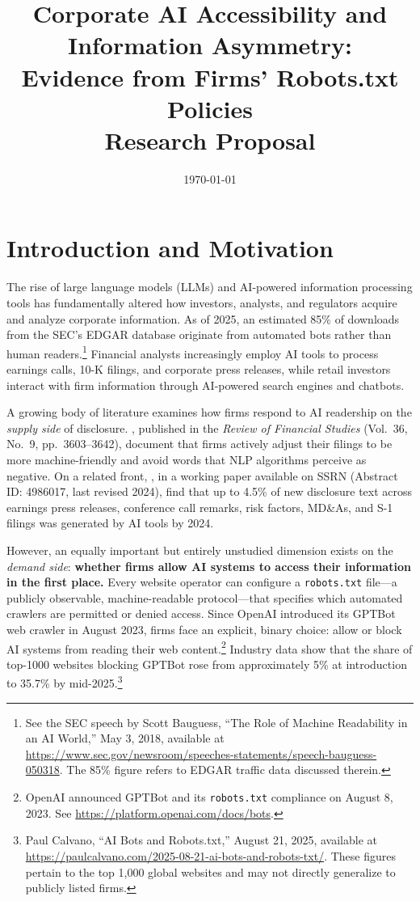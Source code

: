 \documentclass[12pt,a4paper]{article}
\title{\textbf{Corporate AI Accessibility and Information Asymmetry: \\
Evidence from Firms' Robots.txt Policies}\\
\vspace{0.5cm}
\large Research Proposal}
\author{}
\date{\today}
\begin{document}
\maketitle

\section{Introduction and Motivation}

The rise of large language models (LLMs) and AI-powered information processing tools has fundamentally altered how investors, analysts, and regulators acquire and analyze corporate information. As of 2025, an estimated 85\% of downloads from the SEC's EDGAR database originate from automated bots rather than human readers.\footnote{See the SEC speech by Scott Bauguess, ``The Role of Machine Readability in an AI World,'' May 3, 2018, available at \url{https://www.sec.gov/newsroom/speeches-statements/speech-bauguess-050318}. The 85\% figure refers to EDGAR traffic data discussed therein.} Financial analysts increasingly employ AI tools to process earnings calls, 10-K filings, and corporate press releases, while retail investors interact with firm information through AI-powered search engines and chatbots.

A growing body of literature examines how firms respond to AI readership on the \emph{supply side} of disclosure. \citet{CaoJiangYangZhang2023}, published in the \emph{Review of Financial Studies} (Vol.\ 36, No.\ 9, pp.\ 3603--3642), document that firms actively adjust their filings to be more machine-friendly and avoid words that NLP algorithms perceive as negative. On a related front, \citet{BlankespoorDeHaanLi2024}, in a working paper available on SSRN (Abstract ID: 4986017, last revised 2024), find that up to 4.5\% of new disclosure text across earnings press releases, conference call remarks, risk factors, MD\&As, and S-1 filings was generated by AI tools by 2024.

However, an equally important but entirely unstudied dimension exists on the \emph{demand side}: \textbf{whether firms allow AI systems to access their information in the first place.} Every website operator can configure a \texttt{robots.txt} file---a publicly observable, machine-readable protocol---that specifies which automated crawlers are permitted or denied access. Since OpenAI introduced its GPTBot web crawler in August 2023, firms face an explicit, binary choice: allow or block AI systems from reading their web content.\footnote{OpenAI announced GPTBot and its \texttt{robots.txt} compliance on August 8, 2023. See \url{https://platform.openai.com/docs/bots}.} Industry data show that the share of top-1000 websites blocking GPTBot rose from approximately 5\% at introduction to 35.7\% by mid-2025.\footnote{Paul Calvano, ``AI Bots and Robots.txt,'' August 21, 2025, available at \url{https://paulcalvano.com/2025-08-21-ai-bots-and-robots-txt/}. These figures pertain to the top 1,000 global websites and may not directly generalize to publicly listed firms.}
\end{document}
